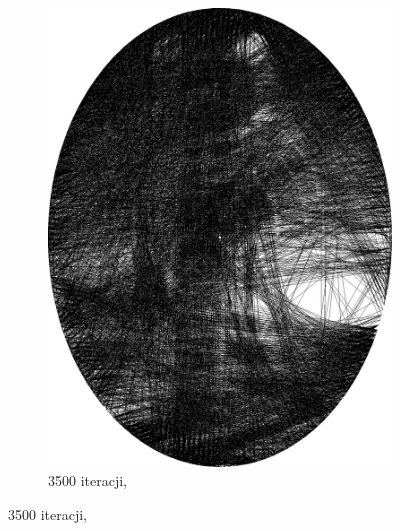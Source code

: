 \documentclass[a4paper, 12pt, polish, twoside]{extreport}
\begin{document}
\begin{figure}[H]
\begin{subfigure}{0.19\textwidth}
            \includegraphics[width = \textwidth]{img/2-theory/aldrin/000mask-aldrin_ellipse_3500_threaded.png}
            \caption{3500 iteracji, }
            \label{przyklad-aldrin-e}
        \end{subfigure}
        

\end{figure}
\end{document}
